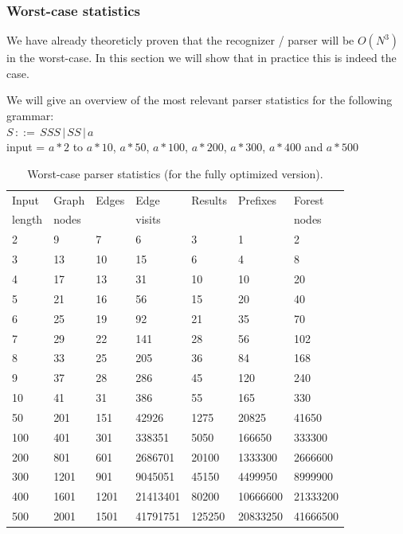 \documentclass[a4paper,10pt]{article}
\begin{document}
\subsubsection{Worst-case statistics}
We have already theoreticly proven that the recognizer / parser will be $O(N^3)$ in the worst-case. In this section we will show that in practice this is indeed the case.

We will give an overview of the most relevant parser statistics for the following grammar:\\
$S\,::=\,SSS\,|\,SS\,|\,a$\\
input = $a * 2$ to $a * 10$, $a * 50$, $a * 100$, $a * 200$, $a * 300$, $a * 400$ and $a * 500$

\begin{table}[H]
\centering
\begin{tabular}{ | p{7ex} | p{7ex} | p{7ex} | p{10ex} | p{8ex} | p{10ex} | p{10ex} | }
  \hline
  Input & Graph & Edges & Edge & Results & Prefixes & Forest \\
  length & nodes & & visits & & & nodes \\
  \hline
  2 & 9 & 7 & 6 & 3 & 1 & 2 \\
  3 & 13 & 10 & 15 & 6 & 4 & 8 \\
  4 & 17 & 13 & 31 & 10 & 10 & 20 \\
  5 & 21 & 16 & 56 & 15 & 20 & 40 \\
  6 & 25 & 19 & 92 & 21 & 35 & 70 \\
  7 & 29 & 22 & 141 & 28 & 56 & 102 \\
  8 & 33 & 25 & 205 & 36 & 84 & 168 \\
  9 & 37 & 28 & 286 & 45 & 120 & 240 \\
  10 & 41 & 31 & 386 & 55 & 165 & 330 \\
  \hline
  50 & 201 & 151 & 42926 & 1275 & 20825 & 41650 \\
  100 & 401 & 301 & 338351 & 5050 & 166650 & 333300 \\
  200 & 801 & 601 & 2686701 & 20100 & 1333300 & 2666600 \\
  300 & 1201 & 901 & 9045051 & 45150 & 4499950 & 8999900 \\
  400 & 1601 & 1201 & 21413401 & 80200 & 10666600 & 21333200 \\
  500 & 2001 & 1501 & 41791751 & 125250 & 20833250 & 41666500 \\
  \hline
\end{tabular}
\caption{Worst-case parser statistics (for the fully optimized version).}
\end{table}
\end{document}
